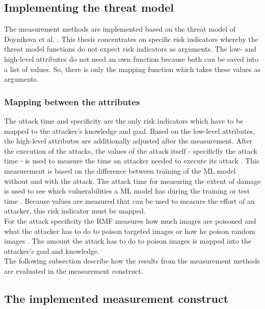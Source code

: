\subsection{Implementing the threat model}
\label{sec:impl_threat_model}

The measurement methods are implemented based on the threat model of Doynikova et al. \cite{DBLP:conf/crisis/DoynikovaNGK20}. This thesis concentrates on specific risk indicators whereby the threat model functions do not expect risk indicators as arguments. The low- and high-level attributes do not need an own function because both can be saved into a list of values. So, there is only the mapping function which takes these values as arguments.

\subsubsection*{Mapping between the attributes}

The attack time and specificity are the only risk indicators which have to be mapped to the attacker's knowledge and goal. Based on the low-level attributes, the high-level attributes are additionally adjusted after the measurement. After the execution of the attacks, the values of the attack itself - specificlly the attack time - is used to measure the time an attacker needed to execute its attack \cite{DBLP:journals/corr/abs-2012-04884}. This measurement is based on the difference between training of the ML model without and with the attack. The attack time for measuring the extent of damage is used to see which vulnerabilities a ML model has during the training or test time \cite{DBLP:journals/csur/RosenbergSER21}. Because values are measured that can be used to measure the effort of an attacker, this risk indicator must be mapped. \\
For the attack specificity the RMF measures how much images are poisoned and what the attacker has to do to poison targeted images \cite{DBLP:conf/iccv/ZhuNXWW21} or how he poison random images \cite{DBLP:journals/corr/abs-1708-06733}. The amount the attack has to do to poison images is mapped into the attacker's goal and knowledge. \\
The following subsection describe how the results from the measurement methods are evaluated in the measurement construct.

\subsection{The implemented measurement construct}

